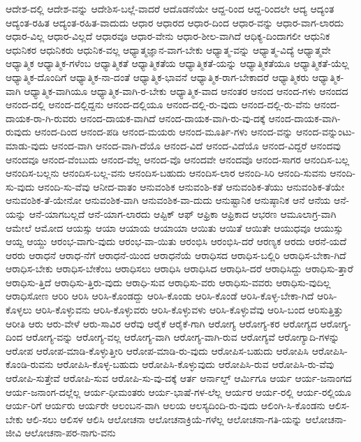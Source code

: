 {ಆದೇಶ-ದಲ್ಲಿ
ಆದೇಶ-ವನ್ನು
ಆದೇಶಿಸ-ಬಲ್ಲೆ-ವಾದರೆ
ಆದೊಡನೆಯೇ
ಆದ್ದ-ರಿಂದ
ಆದ್ದ-ರಿಂದಲೇ
ಆದ್ಯ
ಆದ್ಯಂತ
ಆದ್ಯಂತ-ರಹಿತ
ಆದ್ಯಂತ-ರಹಿತ-ವಾದುದು
ಆಧಾರ
ಆಧಾರದ
ಆಧಾರ-ದಿಂದ
ಆಧಾರ-ವನ್ನು
ಆಧಾರ-ವಾಗ-ಲಾರದು
ಆಧಾರ-ವಿಲ್ಲ
ಆಧಾರ-ವಿಲ್ಲದೆ
ಆಧಾರವೂ
ಆಧಾರ-ವೇನು
ಆಧಾರ-ಶೀಲ-ವಾಗಿದೆ
ಆಧಿಕ್ಯ-ದಿಂದಾಗಲೀ
ಆಧುನಿಕ
ಆಧುನಿಕರ
ಆಧುನಿಕರು
ಆಧುನಿಕ-ವಲ್ಲ
ಆಧ್ಯಾತ್ಮಜ್ಞಾನ-ವಾಗ-ಬೇಕು
ಆಧ್ಯಾತ್ಮ-ವನ್ನು
ಆಧ್ಯಾತ್ಮ-ವಿದ್ಯೆ
ಆಧ್ಯಾತ್ಮವೇ
ಆಧ್ಯಾತ್ಮಿಕ
ಆಧ್ಯಾತ್ಮಿಕ-ಗಳೆಂಬ
ಆಧ್ಯಾತ್ಮಿಕತೆ
ಆಧ್ಯಾತ್ಮಿಕತೆಯ
ಆಧ್ಯಾತ್ಮಿಕತೆ-ಯನ್ನು
ಆಧ್ಯಾತ್ಮಿಕತೆಯೂ
ಆಧ್ಯಾತ್ಮಿಕತೆ-ಯೆಲ್ಲ
ಆಧ್ಯಾತ್ಮಿಕ-ದೊಂದಿಗೆ
ಆಧ್ಯಾತ್ಮಿಕ-ನಾ-ದಂತೆ
ಆಧ್ಯಾತ್ಮಿಕ-ಭಾವನೆ
ಆಧ್ಯಾತ್ಮಿಕ-ರಾಗ-ಬೇಕಾದರೆ
ಆಧ್ಯಾತ್ಮಿಕರು
ಆಧ್ಯಾತ್ಮಿಕ-ವಾಗಿ
ಆಧ್ಯಾತ್ಮಿಕ-ವಾಗಿಯೂ
ಆಧ್ಯಾತ್ಮಿಕ-ವಾಗಿ-ರ-ಬೇಕು
ಆಧ್ಯಾತ್ಮಿಕ-ವಾದ
ಆನಂತರ
ಆನಂದ
ಆನಂದ-ಗಳು
ಆನಂದದ
ಆನಂದ-ದಲ್ಲಿ
ಆನಂದ-ದಲ್ಲಿದ್ದನು
ಆನಂದ-ದಲ್ಲಿಯೂ
ಆನಂದ-ದಲ್ಲಿ-ರು-ವುದು
ಆನಂದ-ದಲ್ಲಿ-ರು-ವೆನು
ಆನಂದ-ದಾಯಕ-ರಾ-ಗಿ-ರುವರು
ಆನಂದ-ದಾಯಕ-ವಾಗಿದೆ
ಆನಂದ-ದಾಯಕ-ವಾಗಿ-ರು-ವು-ದಕ್ಕೆ
ಆನಂದ-ದಾಯಕ-ವಾಗಿ-ರುವುದು
ಆನಂದ-ದಿಂದ
ಆನಂದ-ಪಡಿ
ಆನಂದ-ಮಯರು
ಆನಂದ-ಮೂರ್ತಿ-ಗಳು
ಆನಂದ-ವನ್ನು
ಆನಂದ-ವನ್ನುಂಟು-ಮಾಡು-ವುದು
ಆನಂದ-ವಾಗಿ
ಆನಂದ-ವಾಗಿ-ದೆಯೊ
ಆನಂದ-ವಿದೆ
ಆನಂದ-ವಿದೆಯೊ
ಆನಂದ-ವಿದ್ದರೆ
ಆನಂದವು
ಆನಂದವೂ
ಆನಂದ-ವೆಂಬುದು
ಆನಂದ-ವೆಲ್ಲ
ಆನಂದ-ವೊ
ಆನಂದವೇ
ಆನಂದವೊ
ಆನಂದ-ಸಾಗರ
ಆನಂದಿಸ-ಬಲ್ಲ
ಆನಂದಿಸ-ಬಲ್ಲನು
ಆನಂದಿಸ-ಬಲ್ಲ-ವನು
ಆನಂದಿಸ-ಬಹುದು
ಆನಂದಿಸ-ಲಾರ
ಆನಂದಿ-ಸಿರಿ
ಆನಂದಿ-ಸುವನು
ಆನಂದಿ-ಸು-ವುದು
ಆನಂದಿ-ಸು-ವೆವು
ಆನೀದ-ವಾತಂ
ಆನುವಂಶಿಕ
ಆನುವಂಶಿ-ಕತೆ
ಆನುವಂಶಿಕ-ತೆಯು
ಆನುವಂಶಿಕ-ತೆಯೇ
ಆನುವಂಶಿಕ-ತೆ-ಯೇನೋ
ಆನುವಂಶಿಕ-ವಾಗಿ
ಆನುವಂಶಿಕ-ವಾ-ದುದು
ಆನುಷ್ಟಾನಿಕ
ಆನುಷ್ಠಾನಿಕ
ಆನೆ
ಆನೆಯ
ಆನೆ-ಯನ್ನು
ಆನೆ-ಯಾಗಬಲ್ಲದೆ
ಆನೆ-ಯಾಗ-ಲಾರದು
ಆಪ್ಟಿಕ್
ಆಫ್
ಆಫ್ರಿಕಾ
ಆಫ್ರಿಕಾದ
ಆಭರಣ
ಆಮೂಲಾಗ್ರ-ವಾಗಿ
ಆಮೇಲೆ
ಆಮೋದ
ಆಯಸ್ಸು
ಆಯಾ
ಆಯಾಯ
ಆಯಾಯಾ
ಆಯಿತು
ಆಯಿತೆ
ಆಯಿತೇ
ಆಯುಧವೂ
ಆಯುಸ್ಸು
ಆಯ್ದ
ಆಯ್ದು
ಆರಂಭ-ವಾಗು-ವುದು
ಆರಂಭ-ವಾ-ಯಿತು
ಆರಂಭಿಸಿ
ಆರಂಭಿಸಿ-ದರೆ
ಆರಣ್ಯಕ
ಆರದು
ಆರನೆ-ಯದೆ
ಆರರು
ಆರಾಧನೆ
ಆರಾಧ-ನೆಗೆ
ಆರಾಧನೆ-ಯಿಂದ
ಆರಾಧನೆಯೆ
ಆರಾಧಿಸದ
ಆರಾಧಿಸ-ಬಲ್ಲಿರಿ
ಆರಾಧಿಸ-ಬೇಕಾ-ಗಿದೆ
ಆರಾಧಿಸ-ಬೇಕು
ಆರಾಧಿಸ-ಬೇಕೆಂಬ
ಆರಾಧಿಸಲು
ಆರಾಧಿಸಿ
ಆರಾಧಿಸಿದ
ಆರಾಧಿಸಿ-ದರೆ
ಆರಾಧಿಸಿದ್ದು
ಆರಾಧಿಸು-ತ್ತಾರೆ
ಆರಾಧಿಸು-ತ್ತಿದೆ
ಆರಾಧಿಸು-ತ್ತಿರು-ವುದು
ಆರಾಧಿ-ಸುವ
ಆರಾಧಿಸು-ವರು
ಆರಾಧಿಸು-ವವರು
ಆರಾಧಿಸು-ವುದಿಲ್ಲ
ಆರಾಧಿಸೋಣ
ಆರಿರಿ
ಆರಿಸಿ
ಆರಿಸಿ-ಕೊಂಡದ್ದು
ಆರಿಸಿ-ಕೊಂಡು
ಆರಿಸಿ-ಕೊಂಡೆ
ಆರಿಸಿ-ಕೊಳ್ಳ-ಬೇಕಾ-ಗಿದೆ
ಆರಿಸಿ-ಕೊಳ್ಳಲು
ಆರಿಸಿ-ಕೊಳ್ಳುವನು
ಆರಿಸಿ-ಕೊಳ್ಳುವರು
ಆರಿಸಿ-ಕೊಳ್ಳುವಳು
ಆರಿಸಿ-ಕೊಳ್ಳುವೆವು
ಆರಿಸಿ-ಬಂದ
ಆರಿಸುತ್ತಿತ್ತು
ಆರೀತಿ
ಆರು
ಆರು-ವೇಳೆ
ಆರು-ಸಾವಿರ
ಆರೆವು
ಆರೈಕೆ
ಆರೈಕೆ-ಗಾಗಿ
ಆರೋಗ್ಯ
ಆರೋಗ್ಯ-ಕರ
ಆರೋಗ್ಯದ
ಆರೋಗ್ಯ-ದಿಂದ
ಆರೋಗ್ಯ-ವನ್ನು
ಆರೋಗ್ಯ-ವಲ್ಲ
ಆರೋಗ್ಯ-ವಾಗಿ
ಆರೋಗ್ಯ-ವಾಗಿ-ರುವ
ಆರೋಗ್ಯವೆ
ಆರೋಗ್ಯಾದಿ-ಗಳನ್ನು
ಆರೋಪ
ಆರೋಪ-ಮಾಡಿ-ಕೊಳ್ಳುತ್ತೀರಿ
ಆರೋಪ-ಮಾಡಿ-ರು-ವುದು
ಆರೋಪಿಸ-ಬಹುದು
ಆರೋಪಿಸಿ
ಆರೋಪಿಸಿ-ಕೊಂಡಿ-ರುವನು
ಆರೋಪಿಸಿ-ಕೊಳ್ಳ-ಬಹುದು
ಆರೋಪಿಸಿ-ಕೊಳ್ಳುವುದು
ಆರೋಪಿಸಿ-ರುವ
ಆರೋಪಿಸಿ-ರು-ವೆವು
ಆರೋಪಿ-ಸುತ್ತೇವೆ
ಆರೋಪಿ-ಸುವ
ಆರೋಪಿ-ಸು-ವು-ದಕ್ಕೆ
ಆರ್ತ
ಆರ್ನಾಲ್ಡ್
ಆರ್ಮಿಗೂ
ಆರ್ಯ
ಆರ್ಯ-ಜನಾಂಗದ
ಆರ್ಯ-ಜನಾಂಗ-ದಲ್ಲೆಲ್ಲ
ಆರ್ಯ-ಧೀಮಂತರು
ಆರ್ಯ-ಭಾಷೆ-ಗಳ-ಲೆಲ್ಲ
ಆರ್ಯರ
ಆರ್ಯ-ರಲ್ಲಿ
ಆರ್ಯ-ರಲ್ಲಿಯೂ
ಆರ್ಯ-ರಿಗೆ
ಆರ್ಯರು
ಆರ್ಯರೇ
ಆಲಂಬನ-ವಾಗಿ
ಆಲಯ
ಆಲಸ್ಯದಿಂದಿ-ರು-ವುದು
ಆಲಿಂಗಿ-ಸಿ-ಕೊಂಡನು
ಆಲಿಸ-ಬೇಕು
ಆಲಿ-ಸಲು
ಆಲಿಸಳ
ಆಲಿಸಿ
ಆಲೋಚನಾ
ಆಲೋಚನಾಕ್ರಿಯೆ-ಗಳೆಲ್ಲ
ಆಲೋಚನಾ-ಗತಿ-ಯನ್ನು
ಆಲೋಚನಾ-ಜೀವಿ
ಆಲೋಚನಾ-ಪರ-ನಾಗು-ವನು
}
